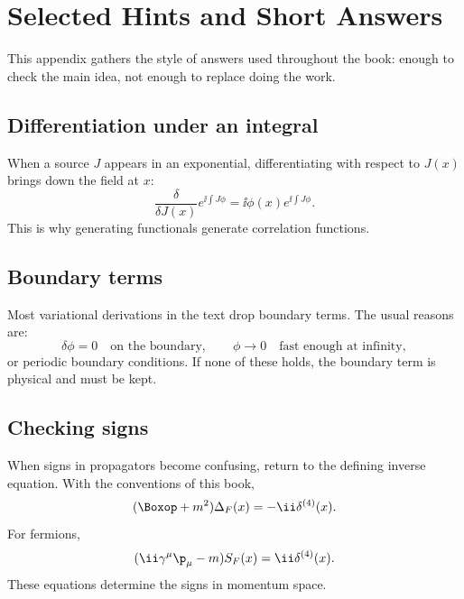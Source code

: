 \chapter{Selected Hints and Short Answers}

This appendix gathers the style of answers used throughout the book: enough to check the main idea, not enough to replace doing the work.

\section{Differentiation under an integral}

When a source \(J\) appears in an exponential, differentiating with respect to \(J(x)\) brings down the field at \(x\):
\[
  \frac{\delta}{\delta J(x)}
  e^{\ii\int J\phi}
  =
  \ii\phi(x)e^{\ii\int J\phi}.
\]
This is why generating functionals generate correlation functions.

\section{Boundary terms}

Most variational derivations in the text drop boundary terms.  The usual reasons are:
\[
  \delta\phi=0\quad\text{on the boundary},
  \qquad
  \phi\to0\quad\text{fast enough at infinity},
\]
or periodic boundary conditions.  If none of these holds, the boundary term is physical and must be kept.

\section{Checking signs}

When signs in propagators become confusing, return to the defining inverse equation.  With the conventions of this book,
\[
  (\Boxop+m^2)\Delta_F(x)=-\ii\delta^{(4)}(x).
\]
For fermions,
\[
  (\ii\gamma^\mu\p_\mu-m)S_F(x)=\ii\delta^{(4)}(x).
\]
These equations determine the signs in momentum space.

